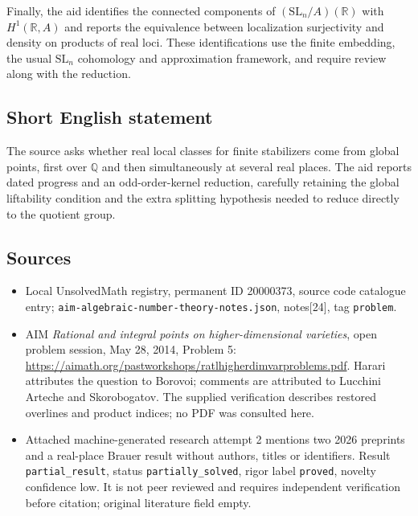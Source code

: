 \documentclass[11pt]{article}
\newcommand{\Q}{\mathbb{Q}}
\newcommand{\R}{\mathbb{R}}
\begin{document}
Finally, the aid identifies the connected components of $(\mathrm{SL}_n/A)(\R)$ with $H^1(\R,A)$ and reports the equivalence between localization surjectivity and density on products of real loci. These identifications use the finite embedding, the usual $\mathrm{SL}_n$ cohomology and approximation framework, and require review along with the reduction.
\subsection{Short English statement}
The source asks whether real local classes for finite stabilizers come from global points, first over $\Q$ and then simultaneously at several real places. The aid reports dated progress and an odd-order-kernel reduction, carefully retaining the global liftability condition and the extra splitting hypothesis needed to reduce directly to the quotient group.
\subsection{Sources}
\begin{itemize}
\item Local UnsolvedMath registry, permanent ID 20000373, source code catalogue entry; \texttt{aim-algebraic-number-theory-notes.json}, notes[24], tag \texttt{problem}.
\item AIM \emph{Rational and integral points on higher-dimensional varieties}, open problem session, May 28, 2014, Problem 5: \url{https://aimath.org/pastworkshops/ratlhigherdimvarproblems.pdf}. Harari attributes the question to Borovoi; comments are attributed to Lucchini Arteche and Skorobogatov. The supplied verification describes restored overlines and product indices; no PDF was consulted here.
\item Attached machine-generated research attempt 2 mentions two 2026 preprints and a real-place Brauer result without authors, titles or identifiers. Result \texttt{partial\_result}, status \texttt{partially\_solved}, rigor label \texttt{proved}, novelty confidence low. It is not peer reviewed and requires independent verification before citation; original literature field empty.
\end{itemize}
\end{document}
